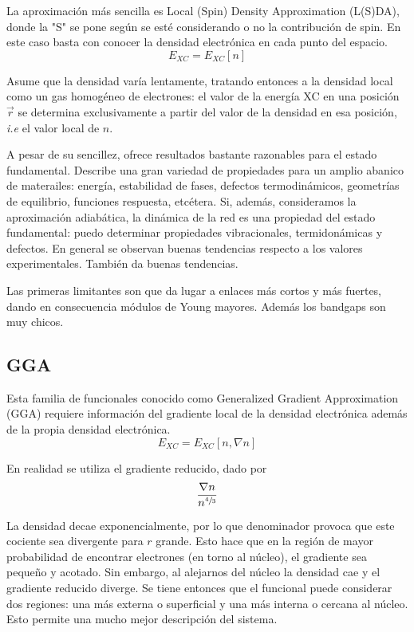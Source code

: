   La aproximación más sencilla es Local (Spin) Density Approximation (L(S)DA), donde la "S" se pone según se esté considerando o no la contribución de spin. En este caso basta con conocer la densidad electrónica en cada punto del espacio.
    $$E_{XC} = E_{XC} [n]$$

  Asume que la densidad varía lentamente, tratando entonces a la densidad local como un gas homogéneo de electrones: el valor de la energía XC en una posición $\vec{r}$ se determina exclusivamente a partir del valor de la densidad en esa posición, \emph{i.e} el valor local de $n$.

  A pesar de su sencillez, ofrece resultados bastante razonables para el estado fundamental. Describe una gran variedad de propiedades para un amplio abanico de materailes: energía, estabilidad de fases, defectos termodinámicos, geometrías de equilibrio, funciones respuesta, etcétera. Si, además, consideramos la aproximación adiabática, la dinámica de la red es una propiedad del estado fundamental: puedo determinar propiedades vibracionales, termidonámicas y defectos. En general se observan buenas tendencias respecto a los valores experimentales. También da buenas tendencias.

  Las primeras limitantes son que da lugar a enlaces más cortos y más fuertes, dando en consecuencia módulos de Young mayores. Además los bandgaps son muy chicos.


\subsection{GGA}

  Esta familia de funcionales conocido como Generalized Gradient Approximation (GGA) requiere información del gradiente local de la densidad electrónica además de la propia densidad electrónica.
    $$E_{XC} = E_{XC} [n, \nabla n]$$

  En realidad se utiliza el gradiente reducido, dado por
    $$\frac{\nabla n}{n^{\sfrac{4}{3}}}$$

  La densidad decae exponencialmente, por lo que denominador provoca que este cociente sea divergente para $r$ grande. Esto hace que en la región de mayor probabilidad de encontrar electrones (en torno al núcleo), el gradiente sea pequeño y acotado. Sin embargo, al alejarnos del núcleo la densidad cae y el gradiente reducido diverge. Se tiene entonces que el funcional puede considerar dos regiones: una más externa o superficial y una más interna o cercana al núcleo. Esto permite una mucho mejor descripción del sistema.

